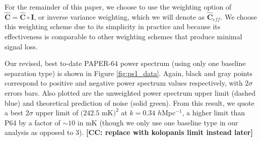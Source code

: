 \documentclass[preprint2,numberedappendix,tighten]{aastex6}  %
\newcommand{\cc}[1]{{\color{purple} \textbf{[CC: #1]}}}
\begin{document}
For the remainder of this paper, we choose to use the weighting option of $\hat{\textbf{C}} = \hat{\textbf{C}} \circ \textbf{I}$, or 
inverse variance weighting, which we will denote as $\hat{\textbf{C}}_{eff}$. We choose this weighting scheme due to its 
simplicity in practice and because its effectiveness is comparable to other weighting schemes that produce minimal signal loss.

Our revised, best to-date PAPER-64 power spectrum (using only one baseline separation type) is shown in Figure 
\ref{fig:ps1_data}. Again, black and gray points correspond to positive and negative power spectrum values respectively, with 
$2\sigma$ errors bars. Also plotted are the unweighted power spectrum upper limit (dashed blue) and theoretical prediction of 
noise (solid green). From this result, we quote a best $2\sigma$ upper limit of $(242.5$ mK$)^{2}$ at $k=0.34$ $h$Mpc$^{-1}$, 
a higher limit than P64 by a factor of $\sim10$ in mK (though we only use one baseline type in our analysis as opposed to $3$). 
\cc{replace with kolopanis limit instead later}
\end{document}

